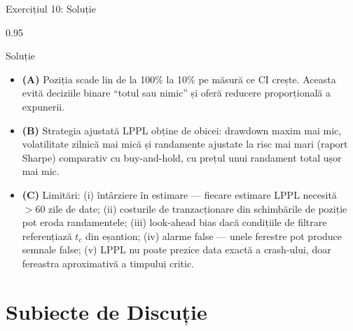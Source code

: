 \documentclass[9pt, aspectratio=169, t]{beamer}
\begin{document}
\begin{frame}{Exercițiul 10: Soluție}
    \begin{cminipage}{0.95\textwidth}
    \begin{exampleblock}{Soluție}
        {\small
        \begin{itemize}\setlength{\itemsep}{3pt}
            \item \textcolor{MainBlue}{\textbf{(A)}} Poziția scade lin de la 100\% la 10\% pe măsură ce CI crește. Aceasta evită deciziile binare ``totul sau nimic'' și oferă reducere proporțională a expunerii.
            \item \textcolor{MainBlue}{\textbf{(B)}} Strategia ajustată LPPL obține de obicei: drawdown maxim mai mic, volatilitate zilnică mai mică și randamente ajustate la risc mai mari (raport Sharpe) comparativ cu buy-and-hold, cu prețul unui randament total ușor mai mic.
            \item \textcolor{MainBlue}{\textbf{(C)}} Limitări: (i) întârziere în estimare --- fiecare estimare LPPL necesită $>60$ zile de date; (ii) costurile de tranzacționare din schimbările de poziție pot eroda randamentele; (iii) look-ahead bias dacă condițiile de filtrare referențiază $t_c$ din eșantion; (iv) alarme false --- unele ferestre pot produce semnale false; (v) LPPL nu poate prezice data exactă a crash-ului, doar fereastra aproximativă a timpului critic.
        \end{itemize}
        }
    \end{exampleblock}
    \end{cminipage}
\end{frame}

\section{Subiecte de Discuție}
\end{document}

